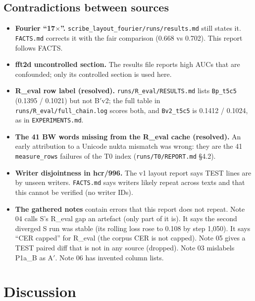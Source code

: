 \documentclass[10.5pt,a4paper]{article}
\newcommand{\fp}[1]{\nolinkurl{#1}}
\newcommand{\Bp}{B$'$}
\newcommand{\Ap}{A$'$}
\begin{document}
\subsection{Contradictions between sources}
\label{sec:contradictions}
\begin{itemize}
\item \textbf{Fourier ``17$\times$''.} \fp{scribe_layout_fourier/runs/results.md} still states it. \fp{FACTS.md} corrects it
  with the fair comparison (0.668 vs 0.702). This report follows FACTS.
\item \textbf{fft2d uncontrolled section.} The results file reports high AUCs that are confounded; only its controlled section
  is used here.
\item \textbf{R\_eval row label (resolved).} \fp{runs/R_eval/RESULTS.md} lists \texttt{Bp\_t5c5} (0.1395 / 0.1021) but not
  \Bp{}v2; the full table in \fp{runs/R_eval/full_chain.log} scores both, and \texttt{Bv2\_t5c5} is 0.1412 / 0.1024, as in
  \fp{EXPERIMENTS.md}.
\item \textbf{The 41 BW words missing from the R\_eval cache (resolved).} An early attribution to a Unicode nukta
  mismatch was wrong: they are the 41 \texttt{measure\_rows} failures of the T0 index (\fp{runs/T0/REPORT.md} \S4.2).
\item \textbf{Writer disjointness in hcr/996.} The v1 layout report says TEST lines are by unseen writers. \fp{FACTS.md} says
  writers likely repeat across texts and that this cannot be verified (no writer IDs).
\item \textbf{The gathered notes} contain errors that this report does not repeat. Note 04 calls S's R\_eval gap an artefact
  (only part of it is). It says the second diverged S run was stable (its rolling loss rose to 0.108 by step 1,050).
  It says ``CER capped'' for R\_eval (the corpus CER is not capped). Note 05 gives a TEST paired diff that is not in any source
  (dropped). Note 03 mislabels P1a\_B as \Ap. Note 06 has invented column lists.
\end{itemize}

\section{Discussion}
\label{sec:discussion}
\end{document}
